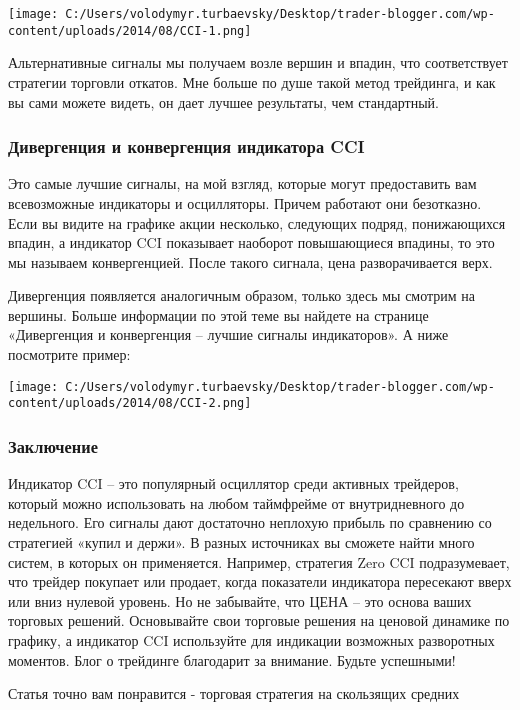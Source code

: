 \documentclass[a5paper]{article}
\begin{document}
\texttt{[image: C:/Users/volodymyr.turbaevsky/Desktop/trader-blogger.com/wp-content/uploads/2014/08/CCI-1.png]}

Альтернативные сигналы мы получаем возле вершин и впадин, что
соответствует стратегии торговли откатов. Мне больше по душе такой
метод трейдинга, и как вы сами можете видеть, он дает лучшее
результаты, чем стандартный.

\subsubsection{Дивергенция и конвергенция индикатора CCI}

Это самые лучшие сигналы, на мой взгляд, которые могут предоставить вам всевозможные индикаторы и осцилляторы. Причем работают они безотказно. Если вы видите на графике акции несколько, следующих подряд, понижающихся впадин, а индикатор CCI показывает наоборот повышающиеся впадины, то это мы называем конвергенцией. После такого сигнала, цена разворачивается верх.

Дивергенция появляется аналогичным образом, только здесь мы смотрим на вершины. Больше информации по этой теме вы найдете на странице «Дивергенция и конвергенция – лучшие сигналы индикаторов». А ниже посмотрите пример:

\texttt{[image: C:/Users/volodymyr.turbaevsky/Desktop/trader-blogger.com/wp-content/uploads/2014/08/CCI-2.png]}

\subsubsection{Заключение}

Индикатор CCI – это популярный осциллятор среди активных трейдеров, который можно использовать на любом таймфрейме от внутридневного до недельного. Его сигналы дают достаточно неплохую прибыль по сравнению со стратегией «купил и держи». В разных источниках вы сможете найти много систем, в которых он применяется. Например, стратегия Zero CCI подразумевает, что трейдер покупает или продает, когда показатели индикатора пересекают вверх или вниз нулевой уровень. Но не забывайте, что ЦЕНА – это основа ваших торговых решений. Основывайте свои торговые решения на ценовой динамике по графику, а индикатор CCI используйте для индикации возможных разворотных моментов. Блог о трейдинге благодарит за внимание. Будьте успешными!


Статья точно вам понравится - торговая стратегия на скользящих средних
\end{document}
